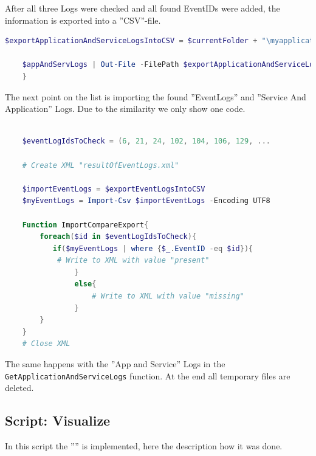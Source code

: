 \clearpage
After all three Logs were checked and all found EventIDs were added, the information is exported into a ''CSV''-file.
\begin{lstlisting}[caption=Function GetApplicationAndServiceLogs Part 2, language=PowerShell]
    $exportApplicationAndServiceLogsIntoCSV = $currentFolder + "\myapplicationandservicelogs.csv"

    $appAndServLogs | Out-File -FilePath $exportApplicationAndServiceLogsIntoCSV
    }
\end{lstlisting}
The next point on the list is importing the found ''EventLogs'' and ''Service And Application'' Logs. Due to the similarity we only show one code.
\begin{lstlisting}[caption=Function ImportCompareExport, language=PowerShell]
    
    $eventLogIdsToCheck = (6, 21, 24, 102, 104, 106, 129, ...

    # Create XML "resultOfEventLogs.xml"

    $importEventLogs = $exportEventLogsIntoCSV
    $myEventLogs = Import-Csv $importEventLogs -Encoding UTF8

    Function ImportCompareExport{
        foreach($id in $eventLogIdsToCheck){
           if($myEventLogs | where {$_.EventID -eq $id}){
            # Write to XML with value "present"
                }
                else{
                    # Write to XML with value "missing"
                }
        }
    }
    # Close XML
\end{lstlisting}
The same happens with the ''App and Service'' Logs in the \lstinline|GetApplicationAndServiceLogs| function. At the end all temporary files are deleted.
\clearpage
\subsection{Script: Visualize}
In this script the '''' is implemented, here the description how it was done.
